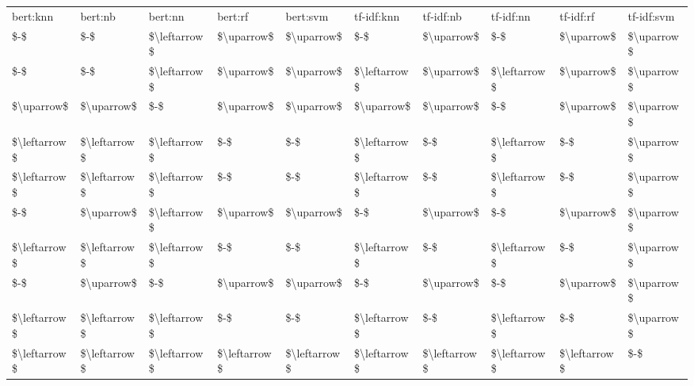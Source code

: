 \begin{tabular}{llllllllll}
\toprule
    bert:knn &      bert:nb &      bert:nn &      bert:rf &     bert:svm &   tf-idf:knn &    tf-idf:nb &    tf-idf:nn &    tf-idf:rf & tf-idf:svm \\
         \$-\$ &          \$-\$ & \$\textbackslash leftarrow\$ &   \$\textbackslash uparrow\$ &   \$\textbackslash uparrow\$ &          \$-\$ &   \$\textbackslash uparrow\$ &          \$-\$ &   \$\textbackslash uparrow\$ & \$\textbackslash uparrow\$ \\
\midrule
         \$-\$ &          \$-\$ & \$\textbackslash leftarrow\$ &   \$\textbackslash uparrow\$ &   \$\textbackslash uparrow\$ & \$\textbackslash leftarrow\$ &   \$\textbackslash uparrow\$ & \$\textbackslash leftarrow\$ &   \$\textbackslash uparrow\$ & \$\textbackslash uparrow\$ \\
  \$\textbackslash uparrow\$ &   \$\textbackslash uparrow\$ &          \$-\$ &   \$\textbackslash uparrow\$ &   \$\textbackslash uparrow\$ &   \$\textbackslash uparrow\$ &   \$\textbackslash uparrow\$ &          \$-\$ &   \$\textbackslash uparrow\$ & \$\textbackslash uparrow\$ \\
\$\textbackslash leftarrow\$ & \$\textbackslash leftarrow\$ & \$\textbackslash leftarrow\$ &          \$-\$ &          \$-\$ & \$\textbackslash leftarrow\$ &          \$-\$ & \$\textbackslash leftarrow\$ &          \$-\$ & \$\textbackslash uparrow\$ \\
\$\textbackslash leftarrow\$ & \$\textbackslash leftarrow\$ & \$\textbackslash leftarrow\$ &          \$-\$ &          \$-\$ & \$\textbackslash leftarrow\$ &          \$-\$ & \$\textbackslash leftarrow\$ &          \$-\$ & \$\textbackslash uparrow\$ \\
         \$-\$ &   \$\textbackslash uparrow\$ & \$\textbackslash leftarrow\$ &   \$\textbackslash uparrow\$ &   \$\textbackslash uparrow\$ &          \$-\$ &   \$\textbackslash uparrow\$ &          \$-\$ &   \$\textbackslash uparrow\$ & \$\textbackslash uparrow\$ \\
\$\textbackslash leftarrow\$ & \$\textbackslash leftarrow\$ & \$\textbackslash leftarrow\$ &          \$-\$ &          \$-\$ & \$\textbackslash leftarrow\$ &          \$-\$ & \$\textbackslash leftarrow\$ &          \$-\$ & \$\textbackslash uparrow\$ \\
         \$-\$ &   \$\textbackslash uparrow\$ &          \$-\$ &   \$\textbackslash uparrow\$ &   \$\textbackslash uparrow\$ &          \$-\$ &   \$\textbackslash uparrow\$ &          \$-\$ &   \$\textbackslash uparrow\$ & \$\textbackslash uparrow\$ \\
\$\textbackslash leftarrow\$ & \$\textbackslash leftarrow\$ & \$\textbackslash leftarrow\$ &          \$-\$ &          \$-\$ & \$\textbackslash leftarrow\$ &          \$-\$ & \$\textbackslash leftarrow\$ &          \$-\$ & \$\textbackslash uparrow\$ \\
\$\textbackslash leftarrow\$ & \$\textbackslash leftarrow\$ & \$\textbackslash leftarrow\$ & \$\textbackslash leftarrow\$ & \$\textbackslash leftarrow\$ & \$\textbackslash leftarrow\$ & \$\textbackslash leftarrow\$ & \$\textbackslash leftarrow\$ & \$\textbackslash leftarrow\$ &        \$-\$ \\
\bottomrule
\end{tabular}
